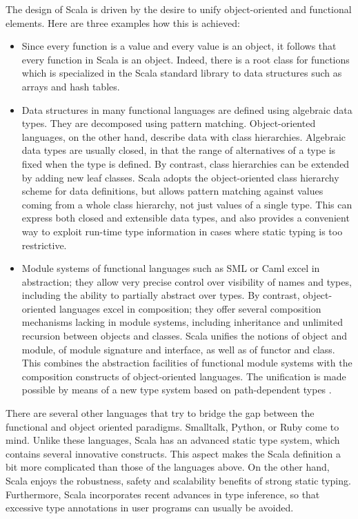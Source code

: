 The design of Scala is driven by the desire to unify object-oriented
and functional elements. Here are three examples how this is achieved:
\begin{itemize}
\item
Since every function is a value and every value is an object, it
follows that every function in Scala is an object. Indeed, there is a
root class for functions which is specialized in the Scala standard
library to data structures such as arrays and hash tables.
\item
Data structures in many functional languages are defined using
algebraic data types. They are decomposed using pattern matching.
Object-oriented languages, on the other hand, describe data with class
hierarchies. Algebraic data types are usually closed, in that the
range of alternatives of a type is fixed when the type is defined.  By
contrast, class hierarchies can be extended by adding new leaf
classes.  Scala adopts the object-oriented class hierarchy scheme for
data definitions, but allows pattern matching against values coming
from a whole class hierarchy, not just values of a single type.
This can express both closed and extensible data types, and also
provides a convenient way to exploit run-time type information in
cases where static typing is too restrictive.
\item
Module systems of functional languages such as SML or Caml excel in
abstraction; they allow very precise control over visibility of names
and types, including the ability to partially abstract over types.  By
contrast, object-oriented languages excel in composition; they offer
several composition mechanisms lacking in module systems, including
inheritance and unlimited recursion between objects and classes.
Scala unifies the notions of object and module, of module signature
and interface, as well as of functor and class. This combines the
abstraction facilities of functional module systems with the
composition constructs of object-oriented languages. The unification
is made possible by means of a new type system based on path-dependent
types \cite{odersky-et-al:fool10}.
\end{itemize}
There are several other languages that try to bridge the gap between
the functional and object oriented
paradigms. Smalltalk\cite{goldberg-robson:smalltalk-language},
Python\cite{rossum:python}, or Ruby\cite{matsumtoto:ruby} come to
mind. Unlike these languages, Scala has an advanced static type
system, which contains several innovative constructs.  This aspect
makes the Scala definition a bit more complicated than those of the
languages above. On the other hand, Scala enjoys the robustness,
safety and scalability benefits of strong static typing. Furthermore,
Scala incorporates recent advances in type inference, so that
excessive type annotations in user programs can usually be avoided.


